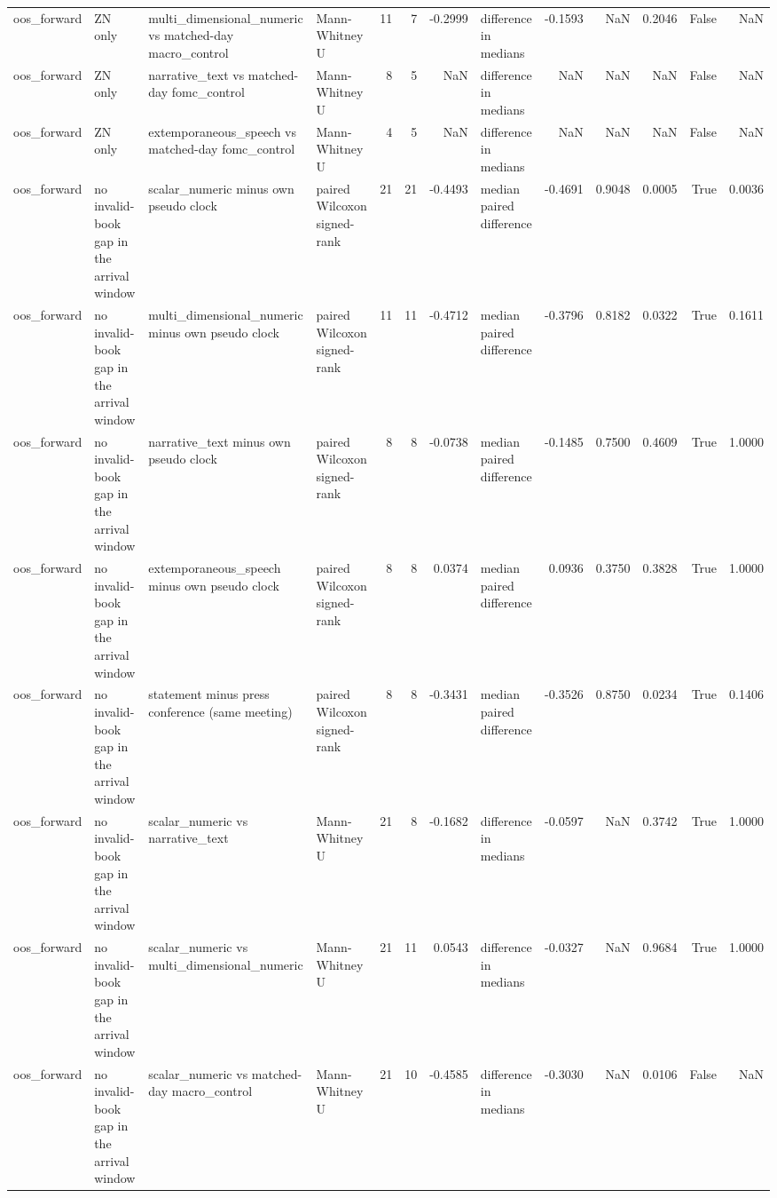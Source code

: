 \begin{tabular}{llllrrrlrrrrr}
oos_forward & ZN only & multi_dimensional_numeric vs matched-day macro_control & Mann-Whitney U & 11 & 7 & -0.2999 & difference in medians & -0.1593 & NaN & 0.2046 & False & NaN \\
oos_forward & ZN only & narrative_text vs matched-day fomc_control & Mann-Whitney U & 8 & 5 & NaN & difference in medians & NaN & NaN & NaN & False & NaN \\
oos_forward & ZN only & extemporaneous_speech vs matched-day fomc_control & Mann-Whitney U & 4 & 5 & NaN & difference in medians & NaN & NaN & NaN & False & NaN \\
oos_forward & no invalid-book gap in the arrival window & scalar_numeric minus own pseudo clock & paired Wilcoxon signed-rank & 21 & 21 & -0.4493 & median paired difference & -0.4691 & 0.9048 & 0.0005 & True & 0.0036 \\
oos_forward & no invalid-book gap in the arrival window & multi_dimensional_numeric minus own pseudo clock & paired Wilcoxon signed-rank & 11 & 11 & -0.4712 & median paired difference & -0.3796 & 0.8182 & 0.0322 & True & 0.1611 \\
oos_forward & no invalid-book gap in the arrival window & narrative_text minus own pseudo clock & paired Wilcoxon signed-rank & 8 & 8 & -0.0738 & median paired difference & -0.1485 & 0.7500 & 0.4609 & True & 1.0000 \\
oos_forward & no invalid-book gap in the arrival window & extemporaneous_speech minus own pseudo clock & paired Wilcoxon signed-rank & 8 & 8 & 0.0374 & median paired difference & 0.0936 & 0.3750 & 0.3828 & True & 1.0000 \\
oos_forward & no invalid-book gap in the arrival window & statement minus press conference (same meeting) & paired Wilcoxon signed-rank & 8 & 8 & -0.3431 & median paired difference & -0.3526 & 0.8750 & 0.0234 & True & 0.1406 \\
oos_forward & no invalid-book gap in the arrival window & scalar_numeric vs narrative_text & Mann-Whitney U & 21 & 8 & -0.1682 & difference in medians & -0.0597 & NaN & 0.3742 & True & 1.0000 \\
oos_forward & no invalid-book gap in the arrival window & scalar_numeric vs multi_dimensional_numeric & Mann-Whitney U & 21 & 11 & 0.0543 & difference in medians & -0.0327 & NaN & 0.9684 & True & 1.0000 \\
oos_forward & no invalid-book gap in the arrival window & scalar_numeric vs matched-day macro_control & Mann-Whitney U & 21 & 10 & -0.4585 & difference in medians & -0.3030 & NaN & 0.0106 & False & NaN \\

\end{tabular}

